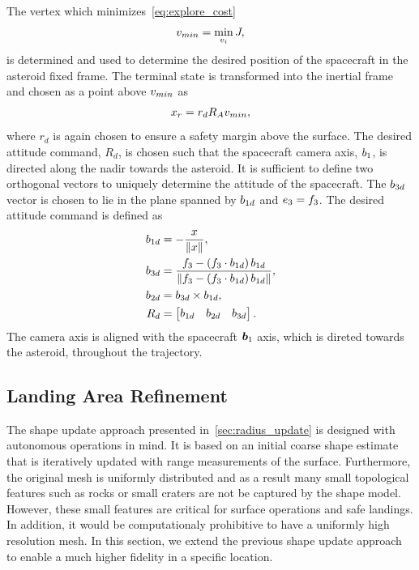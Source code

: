 The vertex which minimizes~\cref{eq:explore_cost} 
\begin{align*}
    v_{min} = \min_{v_i} J,
\end{align*}
is determined and used to determine the desired position of the spacecraft in the asteroid fixed frame.
The terminal state is transformed into the inertial frame and chosen as a point above \( v_{min} \) as
\begin{align}
    x_r = r_d R_A v_{min}, 
\end{align}
where \( r_d \) is again chosen to ensure a safety margin above the surface.
The desired attitude command, \( R_d\), is chosen such that the spacecraft camera axis, \( b_1 \), is directed along the nadir towards the asteroid.
It is sufficient to define two orthogonal vectors to uniquely determine the attitude of the spacecraft.
The \( b_{3d} \) vector is chosen to lie in the plane spanned by \(b_{1d} \) and \( e_3 = f_3 \).
The desired attitude command is defined as
\begin{align}
    b_{1d} &= - \frac{x}{\left\| x \right\|} , \\
    b_{3d} &= \frac{f_3 - \left( f_3 \cdot b_{1d} \right) b_{1d}}{\left\| f_3 - \left( f_3 \cdot b_{1d} \right) b_{1d} \right\|}, \\
    b_{2d} &= b_{3d} \times b_{1d} , \\
    R_d &= \begin{bmatrix} b_{1d} & b_{2d} & b_{3d} \end{bmatrix} .
\end{align}
The camera axis is aligned with the spacecraft \( \bm{b}_ 1 \) axis, which is direted towards the asteroid, throughout the trajectory.

\subsection{Landing Area Refinement}\label{sec:landing_refinement}
The shape update approach presented in~\cref{sec:radius_update} is designed with autonomous operations in mind. 
It is based on an initial coarse shape estimate that is iteratively updated with range measurements of the surface.
Furthermore, the original mesh is uniformly distributed and as a result many small topological features such as rocks or small craters are not be captured by the shape model. 
However, these small features are critical for surface operations and safe landings.
In addition, it would be computationaly prohibitive to have a uniformly high resolution mesh.
In this section, we extend the previous shape update approach to enable a much higher fidelity in a specific location.

